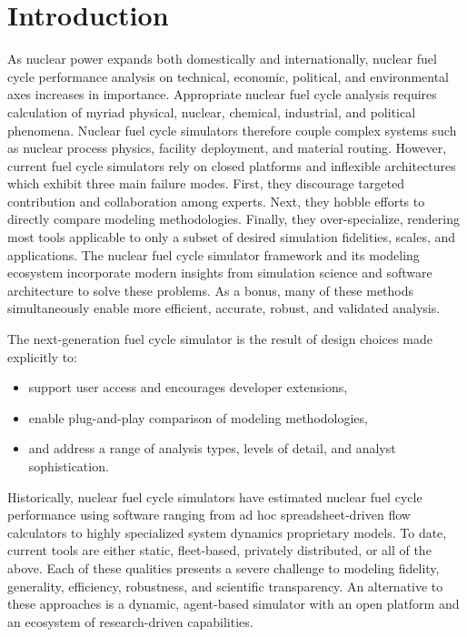 
\section{Introduction}



As nuclear power expands both domestically and internationally, nuclear fuel
cycle performance analysis on technical, economic, political, and environmental
axes increases in importance. Appropriate nuclear fuel cycle analysis requires
calculation of myriad physical, nuclear, chemical, industrial, and political
phenomena. Nuclear fuel cycle simulators therefore couple complex systems such
as nuclear process physics, facility deployment, and material routing.
However, current fuel cycle simulators rely on closed platforms and inflexible
architectures which exhibit three main failure modes. First, they discourage
targeted contribution and collaboration among experts. Next, they hobble
efforts to directly compare modeling methodologies. Finally, they 
over-specialize, rendering most tools applicable to only a subset of
desired simulation fidelities, scales, and applications.
The \Cyclus nuclear fuel cycle simulator framework and 
its modeling ecosystem incorporate modern insights from
simulation science and software architecture to solve these problems. 
As a bonus, many of these methods simultaneously enable more efficient, accurate,
robust, and validated analysis. 

The \Cyclus next-generation fuel cycle simulator is the result of design 
choices made explicitly to:
\begin{itemize}
\item support user access and encourages developer extensions,
\item enable plug-and-play comparison of modeling methodologies,
\item and address a range of analysis types, levels of detail, and analyst sophistication.
\end{itemize}

Historically, nuclear fuel cycle simulators have estimated 
nuclear fuel cycle performance using software 
ranging from ad hoc spreadsheet-driven flow calculators to highly specialized 
system dynamics
proprietary models. To date, current tools are either static, fleet-based, 
privately distributed, or all of the above. Each of these qualities presents a 
severe challenge to modeling fidelity, generality, efficiency, robustness, and 
scientific transparency. 
An alternative to these approaches is a dynamic, agent-based simulator with an 
open platform and an ecosystem of research-driven capabilities.  

